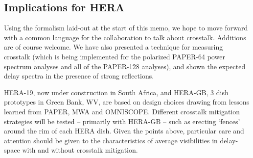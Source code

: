 \documentclass[10pt,a4paper,notitlepage]{article}
\begin{document}
\subsection{Implications for HERA}

Using the formalism laid-out at the start of this memo, we hope to move forward with a common language for the collaboration to talk about crosstalk. Additions are of course welcome. We have also presented a technique for measuring crosstalk (which is being implemented for the polarized PAPER-64 power spectrum analyses and all of the PAPER-128 analyses), and shown the expected delay spectra in the presence of strong reflections. 

HERA-19, now under construction in South Africa, and HERA-GB, 3 dish prototypes in Green Bank, WV, are based on design choices drawing from lessons learned from PAPER, MWA and OMNISCOPE. Different crosstalk mitigation strategies will be tested -- primarily with HERA-GB -- such as erecting `fences' around the rim of each HERA dish.
Given the points above, particular care and attention should be given to the characteristics of average visibilities in delay-space with and without crosstalk mitigation.



\end{document}
